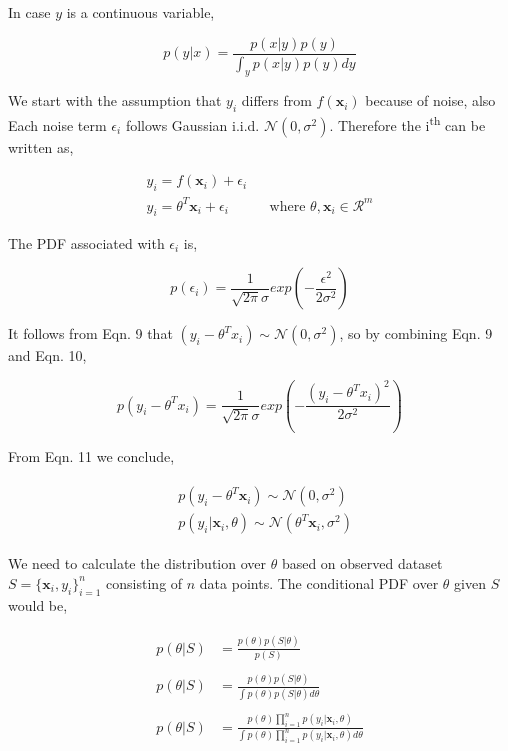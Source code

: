 \documentclass[english]{tktltiki}
\begin{document}
In case $y$ is a continuous variable,

\begin{equation}
p(y|x) = \frac{p(x|y)p(y)}{\int_y{p(x|y)p(y)dy}}
\end{equation}

We start with the assumption that $y_i$ differs from $f(\mathbf{x}_i)$ because of noise, also Each noise term $\epsilon_i$ follows Gaussian i.i.d. $\mathcal{N}(0, \sigma ^2)$. Therefore the i\textsuperscript{th} can be written as,

\begin{eqnarray}
y_i = f(\mathbf{x}_i) + \epsilon_i \nonumber \\
y_i = \theta ^T \mathbf{x}_i + \epsilon_i && \text{where $\theta, \mathbf{x}_i \in \mathcal{R}^m$}
\end{eqnarray}

The PDF associated with $\epsilon_i$ is,

\begin{equation}
p(\epsilon_i) = \frac{1}{\sqrt{2 \pi} \sigma} exp(-\frac{\epsilon^2}{2 \sigma^2})
\end{equation}


It follows from Eqn. 9 that $(y_i - \theta ^T x_i) \sim \mathcal{N}(0, \sigma^2)$, so by combining Eqn. 9 and Eqn. 10,

\begin{equation}
p(y_i - \theta ^T x_i) = \frac{1}{\sqrt{2 \pi} \sigma} exp(-\frac{(y_i - \theta ^T x_i)^2}{2 \sigma^2})
\end{equation}

From Eqn. 11 we conclude,

\begin{eqnarray}
\begin{split}
&p(y_i - \theta ^T \mathbf{x}_i) \sim \mathcal{N}(0, \sigma^2) \nonumber \\
&p(y_i | \mathbf{x}_i, \theta) \sim \mathcal{N}(\theta^T \mathbf{x}_i, \sigma^2)
\end{split}
\end{eqnarray}

We need to calculate the distribution over $\theta$ based on observed dataset $S = \{\mathbf{x}_i, y_i\}_{i=1}^n$ consisting of $n$ data points. The conditional PDF over $\theta$ given $S$ would be,

\begin{eqnarray}
\begin{split}
p(\theta | S) &= \frac{p(\theta)p(S | \theta)}{p(S)} \nonumber \\
&~\\
p(\theta | S) &= \frac{p(\theta)p(S | \theta)}{\int p(\theta)p(S | \theta)d\theta} \nonumber \\
&~\\
p(\theta | S) &= \frac{p(\theta) \prod_{i=1}^n p(y_i | \mathbf{x}_i, \theta)}{\int p(\theta) \prod_{i=1}^n p(y_i | \mathbf{x}_i, \theta) d\theta}
\end{split}
\end{eqnarray}
\end{document}
